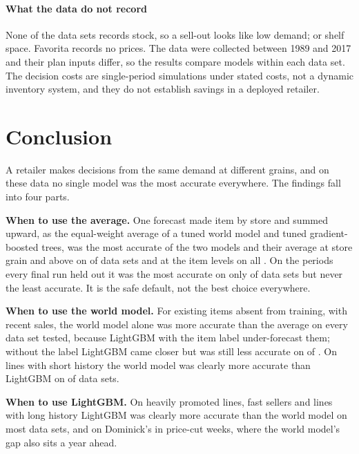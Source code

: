 \paragraph{What the data do not record}
None of the data sets records stock, so a sell-out looks like low demand; or
shelf space. Favorita records no prices. The data were collected between 1989
and 2017 and their plan inputs differ, so the results compare models within each
data set. The decision costs are single-period simulations under stated costs, not a
dynamic inventory system, and they do not establish savings in a deployed retailer.

\section{Conclusion}
\label{sec:conclusion}

A retailer makes decisions from the same demand at different grains, and on these data no single
model was the most accurate everywhere. The findings fall into four parts.

\textbf{When to use the average.} One forecast made item by store and summed upward, as the
equal-weight average of a tuned world model and tuned gradient-boosted trees, was the most accurate
of the two models and their average at store grain and above on \rqAvgBestCoarseWord{} of
\rqNineWord{} data sets and at the item levels on all \rqAvgBestItemWord{}. On the periods every
final run held out it was the most accurate on only \hoAvgBest{} of \hoSets{} data sets but never the
least accurate. It is the safe default, not the best choice everywhere.

\textbf{When to use the world model.} For existing items absent from training, with recent sales, the world model alone was more
accurate than the average on every data set tested, because LightGBM with the item label
under-forecast them; without the label LightGBM came closer but was still less accurate on
\rqWmBeatsNoid{} of \rqNoidSets{}. On lines with short history the world model was clearly more
accurate than LightGBM on \kWmBetterShortHistory{} of \rqNineWord{} data sets.

\textbf{When to use LightGBM.} On heavily promoted lines, fast sellers and lines with long history
LightGBM was clearly more accurate than the world model on most data sets, and on Dominick's in
price-cut weeks, where the world model's gap also sits a year ahead.

